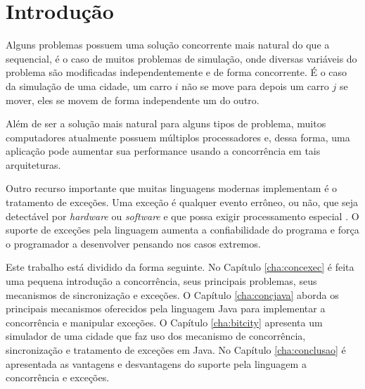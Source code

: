 \chapter{Introdução}

Alguns problemas possuem uma solução concorrente mais natural do que a
sequencial, é o caso de muitos problemas de simulação, onde diversas
variáveis do problema são modificadas independentemente e de forma
concorrente. É o caso da simulação de uma cidade, um carro $i$ não se move
para depois um carro $j$ se mover, eles se movem de forma independente um
do outro.

Além de ser a solução mais natural para alguns tipos de problema, muitos
computadores atualmente possuem múltiplos processadores e, dessa forma, 
uma aplicação pode aumentar sua performance usando a concorrência em tais
arquiteturas.

Outro recurso importante que muitas linguagens modernas implementam é o
tratamento de exceções. Uma exceção é qualquer evento errôneo, ou não,
que seja detectável por \textit{hardware} ou \textit{software} e que possa
exigir processamento especial \cite{sebesta}. O suporte de exceções pela
linguagem aumenta a confiabilidade do programa e força o programador
a desenvolver pensando nos casos extremos.

Este trabalho está dividido da forma seguinte. No Capítulo
\ref{cha:concexec} é feita uma pequena introdução a concorrência, seus
principais problemas, seus mecanismos de sincronização e exceções. O
Capítulo \ref{cha:concjava} aborda os principais mecanismos oferecidos pela
linguagem Java para implementar a concorrência e manipular exceções. O
Capítulo \ref{cha:bitcity} apresenta um simulador de uma cidade que faz
uso dos mecanismo de concorrência, sincronização e tratamento de
exceções em Java. No Capítulo \ref{cha:conclusao} é apresentada as
vantagens e desvantagens do suporte pela linguagem a concorrência e
exceções. 
